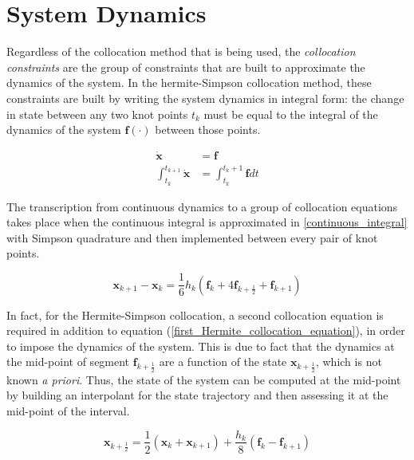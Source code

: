 \documentclass{thesisreport}
\begin{document}
  
\section{System Dynamics}

Regardless of the collocation method that is being used, the \textit{collocation constraints} are the group of constraints that are built to approximate the dynamics of the system. In the hermite-Simpson collocation method, these constraints are built by writing the system dynamics in integral form: the change in state between any two knot points $t_k$ must be equal to the integral of the dynamics of the system $\bm{f}(\cdot)$ between those points.
  
  
  \begin{align}
  	\dot{\bm{x}} &= \bm{f} \\
  	\int_{t_k}^{t_{k+1}} \dot{\bm{x}} &= \int_{t_k}^{t_k+1} \bm{f} dt  	\label{continuous_integral}
  \end{align}
  
  The transcription from continuous dynamics to a group of collocation equations takes place when the continuous integral is approximated in  \ref{continuous_integral} with Simpson quadrature and then implemented between every pair of knot points. 
  
  \begin{equation}\label{first_Hermite_collocation_equation}
  	\bm{x}_{k+1} - \bm{x}_k = \frac{1}{6} h_k(\bm{f}_k + 4 \bm{f}_{k + \frac{1}{2}} + \bm{f}_{k+1})
  \end{equation}
  	
  In fact, for the Hermite-Simpson collocation, a second collocation equation is required in addition to equation (\ref{first_Hermite_collocation_equation}), in order to impose the dynamics of the system. This is due to fact that the dynamics at the mid-point of segment $\bm{f}_{k+\frac{1}{2}}$ are a function of the state $\bm{x}_{k+\frac{1}{2}}$, which is not known \textit{a priori}. Thus, the state of the system can be computed at the mid-point by building an interpolant for the state trajectory  and then assessing it at the mid-point of the interval.
  

	\begin{equation}\label{second_Hermite_collocation_equation}
	\bm{x}_{k+\frac{1}{2}} = \frac{1}{2}( \bm{x}_k + \bm{x}_{k+1}) + \frac{h_k}{8}(\bm{f}_k - \bm{f}_{k+1})
	\end{equation}
  
\end{document}
